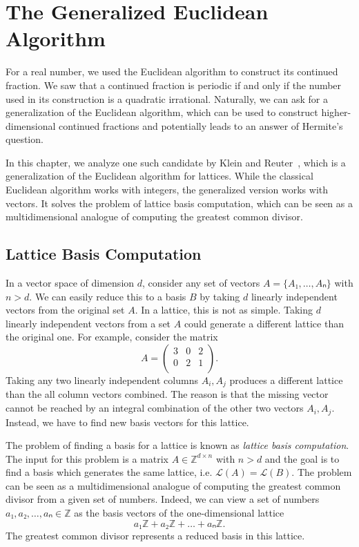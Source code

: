 \chapter{The Generalized Euclidean Algorithm}
\label{ch:generalized-euclidean}

For a real number, we used the Euclidean algorithm to construct its continued
fraction.
We saw that a continued fraction is periodic if and only if the number used in
its construction is a quadratic irrational.
Naturally, we can ask for a generalization of the Euclidean algorithm,
which can be used to construct higher-dimensional continued fractions
and potentially leads to an answer of Hermite's question.

In this chapter, we analyze one such candidate by Klein and Reuter~\cite{Klein24},
which is a generalization of the Euclidean algorithm for lattices.
While the classical Euclidean algorithm works with integers,
the generalized version works with vectors.
It solves the problem of lattice basis computation,
which can be seen as a multidimensional analogue of computing the greatest
common divisor.

\section{Lattice Basis Computation}

In a vector space of dimension $d$, consider any set of vectors $A = \{A₁, …, Aₙ\}$ with $n > d$.
We can easily reduce this to a basis $B$ by taking $d$ linearly independent vectors from the original set $A$.
In a lattice, this is not as simple.
Taking $d$ linearly independent vectors from a set $A$ could generate a
different lattice than the original one.
For example, consider the matrix
\[
  A = \begin{pmatrix}
    3 & 0 & 2 \\
    0 & 2 & 1 \\
  \end{pmatrix}.
\]
Taking any two linearly independent columns $A_i, A_j$
produces a different lattice than the all column vectors combined.
The reason is that the missing vector cannot be reached by an
integral combination of the other two vectors $A_i, A_j$.
Instead, we have to find new basis vectors for this lattice.

The problem of finding a basis for a lattice is known as \emph{lattice basis computation}.
The input for this problem is a matrix $A ∈ ℤ^{d×n}$ with $n > d$ and the goal
is to find a basis which generates the same lattice,
i.e. $\mathcal L(A) = \mathcal L(B)$.
The problem can be seen as a multidimensional analogue of
computing the greatest common divisor from a given set of numbers.
Indeed, we can view a set of numbers $a₁, a₂, …, aₙ ∈ ℤ$ as the basis vectors
of the one-dimensional lattice
\[
  a₁ℤ + a₂ ℤ + \dots + aₙ ℤ.
\]
The greatest common divisor represents a reduced basis in this lattice.

